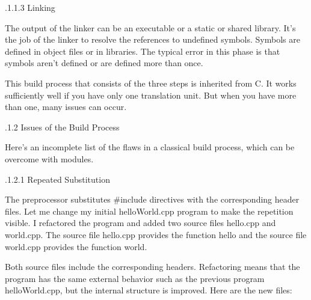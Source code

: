 .1.1.3\hspace{0.2cm} Linking

The output of the linker can be an executable or a static or shared library. It’s the job of the linker to resolve the references to undefined symbols. Symbols are defined in object files or in libraries. The typical error in this phase is that symbols aren’t defined or are defined more than once.

This build process that consists of the three steps is inherited from C. It works sufficiently well if you have only one translation unit. But when you have more than one, many issues can occur.

.1.2\hspace{0.2cm} Issues of the Build Process

Here’s an incomplete list of the flaws in a classical build process, which can be overcome with modules.

.1.2.1\hspace{0.2cm} Repeated Substitution

The preprocessor substitutes \#include directives with the corresponding header files. Let me change my initial helloWorld.cpp program to make the repetition visible. I refactored the program and added two source files hello.cpp and world.cpp. The source file hello.cpp provides the function hello and the source file world.cpp provides the function world.

Both source files include the corresponding headers. Refactoring means that the program has the same external behavior such as the previous program helloWorld.cpp, but the internal structure is improved. Here are the new files:

